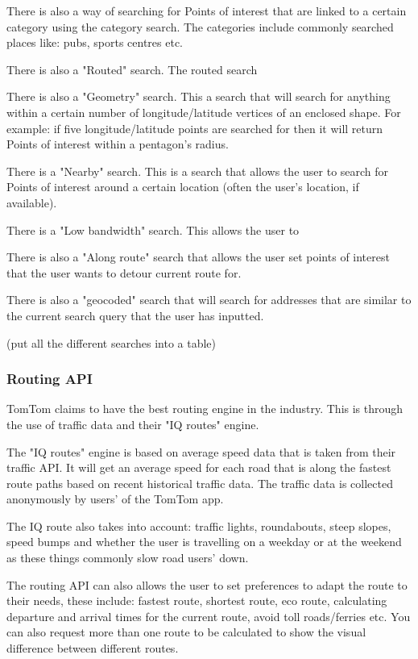 \documentclass[12pt,a4paper]{article}
\begin{document}
There is also a way of searching for Points of interest that are linked to a certain category using the category search. The categories include commonly searched places like: pubs, sports centres etc.

There is also a "Routed" search. The routed search 

There is also a "Geometry" search. This a search that will search for anything within a certain number of longitude/latitude vertices of an enclosed shape. For example: if five longitude/latitude points are searched for then it will return Points of interest within a pentagon's radius. 

There is a "Nearby" search. This is a search that allows the user to search for Points of interest around a certain location (often the user's location, if available).

There is a "Low bandwidth" search. This allows the user to 

There is also a "Along route" search that allows the user set points of interest that the user wants to detour current route for. 

There is also a "geocoded" search that will search for addresses that are similar to the current search query that the user has inputted.

(put all the different searches into a table)

\subsubsection{Routing API}

TomTom claims to have the best routing engine in the industry. This is through the use of traffic data and their "IQ routes" engine.

The "IQ routes" engine is based on average speed data that is taken from their traffic API. It will get an average speed for each road that is along the fastest route paths based on recent historical traffic data. The traffic data is collected anonymously by users' of the TomTom app. 

The IQ route also takes into account: traffic lights, roundabouts, steep slopes, speed bumps and whether the user is travelling on a weekday or at the weekend as these things commonly slow road users' down.

The routing API can also allows the user to set preferences to adapt the route to their needs, these include: fastest route, shortest route, eco route, calculating departure and arrival times for the current route, avoid toll roads/ferries etc. You can also request more than one route to be calculated to show the visual difference between different routes.
\end{document}
